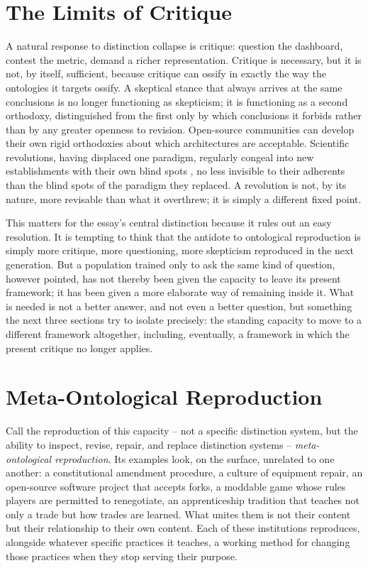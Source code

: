 \documentclass[11pt]{article}
\theoremstyle{plain}
\begin{document}
\section{The Limits of Critique}
\label{sec:limits-critique}

A natural response to distinction collapse is critique: question the dashboard, contest the metric, demand a richer representation. Critique is necessary, but it is not, by itself, sufficient, because critique can ossify in exactly the way the ontologies it targets ossify. A skeptical stance that always arrives at the same conclusions is no longer functioning as skepticism; it is functioning as a second orthodoxy, distinguished from the first only by which conclusions it forbids rather than by any greater openness to revision. Open-source communities can develop their own rigid orthodoxies about which architectures are acceptable. Scientific revolutions, having displaced one paradigm, regularly congeal into new establishments with their own blind spots \cite{kuhn1962}, no less invisible to their adherents than the blind spots of the paradigm they replaced. A revolution is not, by its nature, more revisable than what it overthrew; it is simply a different fixed point.

This matters for the essay's central distinction because it rules out an easy resolution. It is tempting to think that the antidote to ontological reproduction is simply more critique, more questioning, more skepticism reproduced in the next generation. But a population trained only to ask the same kind of question, however pointed, has not thereby been given the capacity to leave its present framework; it has been given a more elaborate way of remaining inside it. What is needed is not a better answer, and not even a better question, but something the next three sections try to isolate precisely: the standing capacity to move to a different framework altogether, including, eventually, a framework in which the present critique no longer applies.

\section{Meta-Ontological Reproduction}
\label{sec:meta-ontological-reproduction}

Call the reproduction of this capacity -- not a specific distinction system, but the ability to inspect, revise, repair, and replace distinction systems -- \emph{meta-ontological reproduction}. Its examples look, on the surface, unrelated to one another: a constitutional amendment procedure, a culture of equipment repair, an open-source software project that accepts forks, a moddable game whose rules players are permitted to renegotiate, an apprenticeship tradition that teaches not only a trade but how trades are learned. What unites them is not their content but their relationship to their own content. Each of these institutions reproduces, alongside whatever specific practices it teaches, a working method for changing those practices when they stop serving their purpose.
\end{document}
